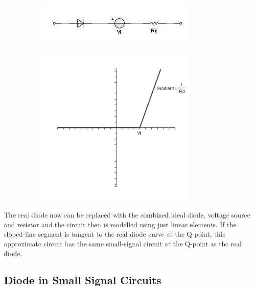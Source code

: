 \begin{figure}[H]
  \centering
  \begin{subfigure}{.45\textwidth}
    \centering
    \includegraphics[width=\linewidth]{figures/Diode_Modelling_Image9}
  \end{subfigure}
  \begin{subfigure}{.4\textwidth}
    \centering
    \includegraphics[width=\linewidth]{figures/Diode_Modelling_Image11}
  \end{subfigure}
\end{figure}

The real diode now can be replaced with the combined ideal diode, voltage source and resistor and the circuit then is modelled using just linear elements. If the sloped-line segment is tangent to the real diode curve at the Q-point, this approximate circuit has the same small-signal circuit at the Q-point as the real diode.

\subsection{Diode in Small Signal Circuits}

